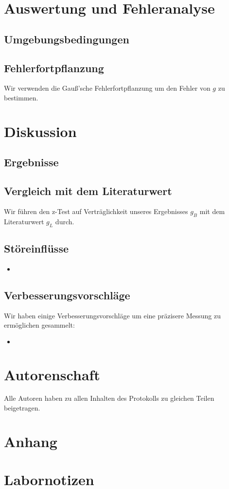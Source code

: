 \documentclass[12pt,a4paper]{article}
\begin{document}
\section{Auswertung und Fehleranalyse}

\subsection{Umgebungsbedingungen}
 
\subsection{Fehlerfortpflanzung}

Wir verwenden die Gauß'sche Fehlerfortpflanzung um den Fehler von $g$ zu bestimmen.

\section{Diskussion}
  
  \subsection{Ergebnisse}


  \subsection{Vergleich mit dem Literaturwert}

Wir führen den z-Test auf Verträglichkeit unseres Ergebnisses $g_B$ mit dem Literaturwert $g_L$ durch.
  
\subsection{Störeinflüsse}

  \begin{itemize}
    \item 
 \end{itemize}
    
  \subsection{Verbesserungsvorschläge}
  Wir haben einige Verbesserungsvorschläge um eine präzisere Messung zu ermöglichen gesammelt:
  \begin{itemize}
    \item 
  \end{itemize}
    
\section{Autorenschaft}
  Alle Autoren haben zu allen Inhalten des Protokolls zu gleichen Teilen beigetragen.
    
\section{Anhang}

\newpage
\section{Labornotizen}
\end{document}
